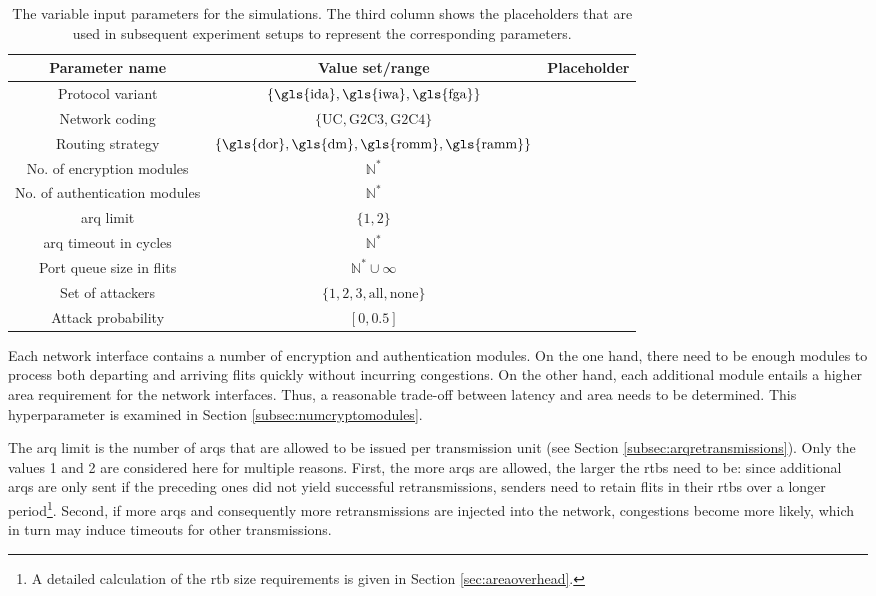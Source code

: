 \begin{table}
    \centering
    \begin{tabulary}{\textwidth}{C|C|C}
        Parameter name & Value set/range & Placeholder \\\hline
        Protocol variant & $\{\text{\gls{ida}}, \text{\gls{iwa}}, \text{\gls{fga}}\}$ & \pProtVar{} \\
        Network coding & $\{\text{UC}, \text{G2C3}, \text{G2C4}\}$ & \pNCMode{} \\
        Routing strategy & $\{\text{\gls{dor}}, \text{\gls{dm}}, \text{\gls{romm}}, \text{\gls{ramm}}\}$ & \pRStrat{} \\
        No. of encryption modules & $\mathbb{N}^*$ & \pEncMods{} \\
        No. of authentication modules & $\mathbb{N}^*$ & \pAuthMods{} \\
        \Gls{arq} limit & $\{1, 2\}$ & \pARQLimit{} \\
        \Gls{arq} timeout in cycles & $\mathbb{N}^*$ & \pARQTimeout{} \\
        Port queue size in flits & $\mathbb{N}^* \cup \infty$ & \pRQSize{} \\
        Set of attackers & $\{1, 2, 3, \text{all}, \text{none}\}$ & \pAttackerSet{} \\
        Attack probability & $[0, 0.5]$ & \pAttackProb{} \\
    \end{tabulary}
    \caption[Variable input parameters for the simulations]{The variable input parameters for the simulations. The third column shows the placeholders
    that are used in subsequent experiment setups to represent the corresponding parameters.}
    \label{tab:inputparams}
\end{table}

Each network interface contains a number of encryption and authentication modules. On the one hand, there need to be enough modules to process both
departing and arriving flits quickly without incurring congestions. On the other hand, each additional module entails a higher area requirement for
the network interfaces. Thus, a reasonable trade-off between latency and area needs to be determined. This hyperparameter is examined in Section
\ref{subsec:numcryptomodules}.

The \gls{arq} limit is the number of \glspl{arq} that are allowed to be issued per transmission unit (see Section \ref{subsec:arqretransmissions}).
Only the values 1 and 2 are considered here for multiple reasons. First, the more \glspl{arq} are allowed, the larger the \glspl{rtb} need to be:
since additional \glspl{arq} are only sent if the preceding ones did not yield successful retransmissions, senders need to retain flits in their
\glspl{rtb} over a longer period\footnote{A detailed calculation of the \gls{rtb} size requirements is given in Section \ref{sec:areaoverhead}.}.
Second, if more \glspl{arq} and consequently more retransmissions are injected into the network, congestions become more likely, which in turn may
induce timeouts for other transmissions.

